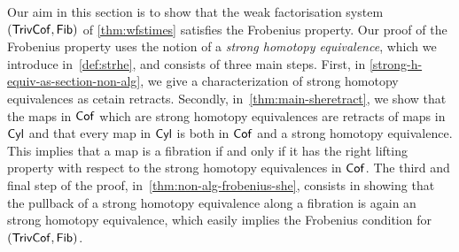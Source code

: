\documentclass[reqno,10pt,a4paper,oneside,draft]{amsart}
\begin{document}
Our aim in this section is to show that
the weak factorisation system $(\mathsf{TrivCof}, \mathsf{Fib})$ of  \cref{thm:wfstimes} satisfies the Frobenius property. Our proof of the Frobenius property uses the notion of a \emph{strong homotopy equivalence}, which we introduce in~\cref{def:strhe}, and consists of three main steps. First, in \cref{strong-h-equiv-as-section-non-alg},  we give a characterization of strong homotopy equivalences as cetain retracts. Secondly, in~\cref{thm:main-sheretract}, we show that the maps in $\mathsf{Cof}$ which are strong homotopy
equivalences are retracts of maps in $\mathsf{Cyl}$ and that every map in $\mathsf{Cyl}$ is both in $\mathsf{Cof}$ and a strong homotopy equivalence. This implies that a map is
a fibration if and only if it has the right lifting property with respect to the strong homotopy equivalences in $\mathsf{Cof}$. The third and final step of the proof, in~\cref{thm:non-alg-frobenius-she},  consists in showing that the pullback
of a strong homotopy equivalence along a fibration is again an strong homotopy equivalence, which easily implies 
the Frobenius condition for $(\mathsf{TrivCof}, \mathsf{Fib})$.
\end{document}
